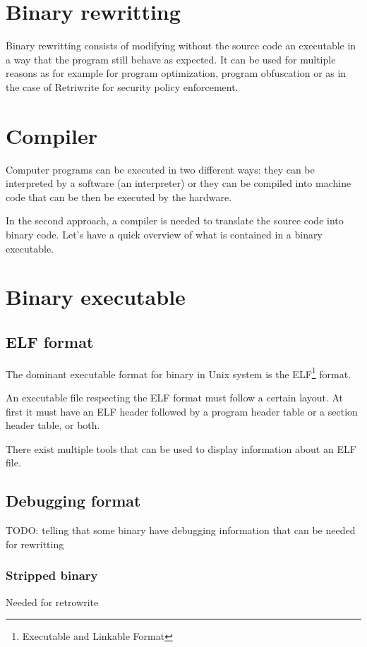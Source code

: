 \documentclass[a4paper,11pt,oneside]{report}
\begin{document}
\section{Binary rewritting}
Binary rewritting consists of modifying without the source code an executable
in a way that the program still behave as expected. It can be used for multiple
reasons as for example for program optimization, program obfuscation or as in
the case of Retriwrite for security policy enforcement. 



\section{Compiler}
Computer programs can be executed in two different ways: they can be interpreted
by a software (an interpreter) or they can be compiled into machine code that can
be then be executed by the hardware.

In the second approach, a compiler is needed to translate the source code into binary code.
Let's have a quick overview of what is contained in a binary executable.

\section{Binary executable}
\subsection{ELF format}
The dominant executable format for binary in Unix system is the ELF\footnote{Executable
and Linkable Format} format. 

An executable file respecting the ELF format must follow a certain layout. At
first it must have an ELF header followed by a program header table or a section
header table, or both. 

There exist multiple tools that can be used to display information about an ELF file. 

\subsection{Debugging format}
TODO: telling that some binary have debugging information that can be needed for rewritting
\subsubsection{Stripped binary}
Needed for retrowrite
\end{document}
